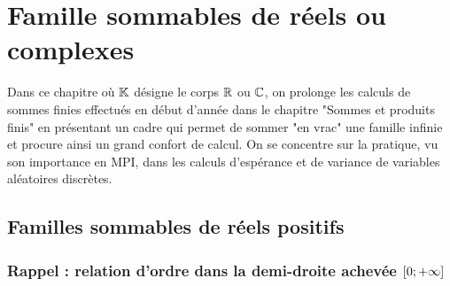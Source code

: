 \chapter{Famille sommables de réels ou complexes}
\minitoc 
Dans ce chapitre où \(\mathbb{K}\) désigne le corps \(\mathbb{R}\) ou \(\mathbb{C}\), on prolonge les calculs de sommes finies effectués en début d’année dans le chapitre "Sommes et produits finis" en présentant un cadre qui permet de sommer "en vrac" une famille infinie et procure ainsi un grand confort de calcul. On se concentre sur la pratique, vu son importance en MPI, dans les calculs d’espérance et de variance de variables aléatoires discrètes.
\section{Familles sommables de réels positifs}
\subsection{Rappel : relation d’ordre dans la demi-droite achevée \(\left[0;+\infty\right]\)}

